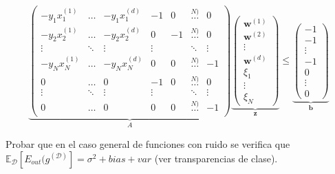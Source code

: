 \documentclass[11pt,leqno]{article}
\theoremstyle{definition}
\begin{document}
\begin{solucion}
\begin{enumerate}[a]
\[ 
\underbrace{
\left(\begin{array}{ccccccc}
-y_1 x_1^{(1)} 	& \dots & -y_1 x_1^{(d)} & -1 & 0 	& \overset{N)}{\dots} 	& 0 \\
-y_2 x_2^{(1)} 	& \dots & -y_2 x_2^{(d)} &  0 & -1 	& \overset{N)}{\dots} 	& 0 \\
\vdots 			& \ddots & \vdots 		 &  \vdots&	 	& \ddots			& \vdots \\
-y_N x_N^{(1)} 	& \dots & -y_N x_N^{(d)} & 0 & 0 	& \overset{N)}{\dots} 	& -1 \\
0			 	& \dots & 0				 & -1 & 0 	& \overset{N)}{\dots} 	& 0 \\
\vdots 			& \ddots & \vdots 		 &  \vdots&	 	& \ddots			& \vdots \\
0				& \dots & 0				 & 0  & 0 	& \overset{N)}{\dots} 	& -1 \\
\end{array}\right)}_A
\underbrace{
\left(
\begin{array}{c}
\mathbf{w}^{(1)} \\ \mathbf{w}^{(2)} \\ \vdots \\ \mathbf{w}^{(d)} \\ 
\xi_1 \\ \vdots \\ \xi_N 
\end{array}
\right)}_\mathbf{z}
\leq
\underbrace{
\left(
\begin{array}{c}
-1 \\ -1 \\ \vdots \\ -1 \\  0 \\ \vdots \\ 0
\end{array}
\right)}_\mathbf{b}
\]

\end{enumerate}
\end{solucion}

\begin{cuestion}
Probar que en el caso general de funciones con ruido se verifica que $\mathbb{E}_\mathcal{D}[E_{out}(g^{(\mathcal{D})}] = \sigma^2 + bias + var$ (ver transparencias de clase).
\end{cuestion}
\end{document}
